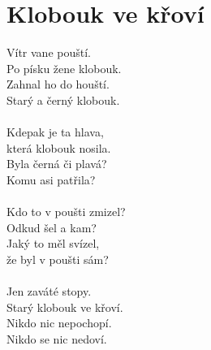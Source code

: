 \section{Klobouk ve křoví}
Vítr vane pouští.\\
Po písku žene klobouk.\\
Zahnal ho do houští.\\
Starý a černý klobouk.\\
\\
Kdepak je ta hlava,\\
která klobouk nosila.\\
Byla černá či plavá?\\
Komu asi patřila?\\
\\
Kdo to v poušti zmizel?\\
Odkud šel a kam?\\
Jaký to měl svízel,\\
že byl v poušti sám?\\
\\
Jen zaváté stopy.\\
Starý klobouk ve křoví.\\
Nikdo nic nepochopí.\\
Nikdo se nic nedoví.\\